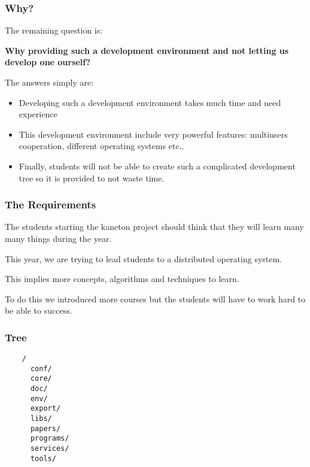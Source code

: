 \documentclass[8pt]{beamer}
\newcommand{\nl}[0]{\vspace{0.4cm}}
\begin{document}

\begin{frame}
  \frametitle{Why?}

  The remaining question is:

  \nl

  \textbf{Why providing such a development environment and not letting us
    develop one ourself?}

  \nl

  The answers simply are:

  \begin{itemize}
    \item
      Developing such a development environment takes much time and
      need experience
    \item
      This development environment include very powerful features:
      multiusers cooperation, different operating systems etc..
    \item
      Finally, students will not be able to create such a complicated
      development tree so it is provided to not waste time.
  \end{itemize}
\end{frame}


\begin{frame}
  \frametitle{The Requirements}

  The students starting the kaneton project should think that they
  will learn many many things during the year.

  \nl

  This year, we are trying to lead students to a distributed operating
  system.

  \nl

  This implies more concepts, algorithms and techniques to learn.

  \nl

  To do this we introduced more courses but the students will have
  to work hard to be able to success.
\end{frame}


\begin{frame}[containsverbatim]
  \frametitle{Tree}

  \begin{center}

  \begin{verbatim}
    /
      conf/
      core/
      doc/
      env/
      export/
      libs/
      papers/
      programs/
      services/
      tools/
  \end{verbatim}

  \end{center}
\end{frame}
\end{document}
